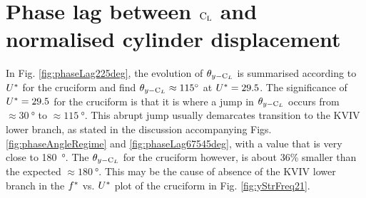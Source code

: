 \documentclass[oneside]{utmthesis}
\begin{document}
\section{Phase lag between $\text{C}_{\text{L}}$ and normalised cylinder displacement} \label{sec:phaseLag22500}
In Fig. \ref{fig:phaseLag225deg}, the evolution of $\theta_{y-\text{C}_{L}}$ is summarised according to $U^{*}$ for the \angtw{} cruciform and find $\plag \approx \SI{115}{\degree}$ at $U^{*} = 29.5$. The significance of $U^{*} = 29.5$ for the \angtw{} cruciform is that it is where a jump in $\theta_{y-\text{C}_{L}}$ occurs from $\approx \SI{30}{\degree}$ to $\approx \SI{115}{\degree}$. This abrupt jump usually demarcates transition to the KVIV lower branch, as stated in the discussion accompanying Figs. \ref{fig:phaseAngleRegime} and \ref{fig:phaseLag67545deg}, with a value that is very close to \SI{180}{\degree}. The $\theta_{y-\text{C}_{L}}$ for the \angtw{} cruciform however, is about 36\% smaller than the expected $\approx \SI{180}{\degree}$. This may be the cause of absence of the KVIV lower branch in the $f^{*}$ vs. $U^{*}$ plot of the \angtw{} cruciform in Fig. \ref{fig:yStrFreq21}.
\end{document}
